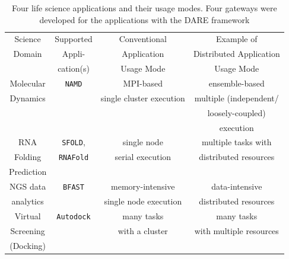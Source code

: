 \documentclass{sig-alternate}
\begin{document}
\begin{table}
 \tiny
\begin{tabular}{|c|c|c|c|} 
  \hline Science  & Supported  & Conventional   & Example of  
  \\
  Domain & Appli- & Application & Distributed Application \\ 
  &  cation(s) & Usage Mode & Usage Mode \\  \hline \hline 
  
  Molecular   &  \texttt{NAMD} &  MPI-based  & ensemble-based   \\
   Dynamics  &  & single cluster execution & multiple (independent/ \\ 
   &  &  &  loosely-coupled)  \\ 
   &  &  &  execution \\ \hline
  RNA   & \texttt{SFOLD}, & single node   & multiple tasks with \\
  Folding   & \texttt{RNAFold} & serial execution &   distributed resources \\
  Prediction & &  & \\ \hline
  NGS data     &  \texttt{BFAST} & memory-intensive  & data-intensive\\ 
     analytics  &  &  single node execution   &  distributed resources \\ \hline
  Virtual  & \texttt{Autodock} &  many tasks   & many tasks \\
   Screening  &  & with a cluster  & with multiple resources \\
  (Docking) &  &  & \\ \hline

\hline
\end{tabular} \caption{Four life science applications and their usage modes.  Four gateways were developed for the applications with the DARE framework}
 \label{table:four-applications} 
\end{table}

% 
% 
\end{document}
